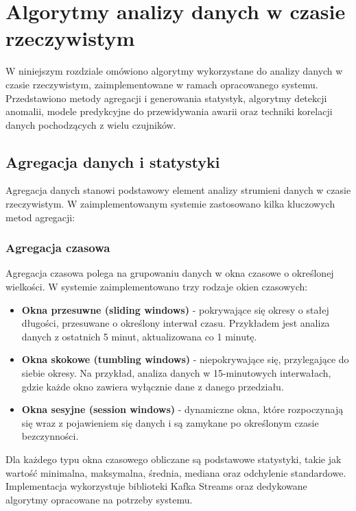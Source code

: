 \section{Algorytmy analizy danych w czasie rzeczywistym}
\label{sec:algorytmy_analizy}

W niniejszym rozdziale omówiono algorytmy wykorzystane do analizy danych w czasie rzeczywistym, zaimplementowane w ramach opracowanego systemu. Przedstawiono metody agregacji i generowania statystyk, algorytmy detekcji anomalii, modele predykcyjne do przewidywania awarii oraz techniki korelacji danych pochodzących z wielu czujników.

\subsection{Agregacja danych i statystyki}
\label{subsec:agregacja_statystyki}

Agregacja danych stanowi podstawowy element analizy strumieni danych w czasie rzeczywistym. W zaimplementowanym systemie zastosowano kilka kluczowych metod agregacji:

\subsubsection{Agregacja czasowa}
\label{subsubsec:agregacja_czasowa}

Agregacja czasowa polega na grupowaniu danych w okna czasowe o określonej wielkości. W systemie zaimplementowano trzy rodzaje okien czasowych:

\begin{itemize}
    \item \textbf{Okna przesuwne (sliding windows)} - pokrywające się okresy o stałej długości, przesuwane o określony interwał czasu. Przykładem jest analiza danych z ostatnich 5 minut, aktualizowana co 1 minutę.
    \item \textbf{Okna skokowe (tumbling windows)} - niepokrywające się, przylegające do siebie okresy. Na przykład, analiza danych w 15-minutowych interwałach, gdzie każde okno zawiera wyłącznie dane z danego przedziału.
    \item \textbf{Okna sesyjne (session windows)} - dynamiczne okna, które rozpoczynają się wraz z pojawieniem się danych i są zamykane po określonym czasie bezczynności.
\end{itemize}

Dla każdego typu okna czasowego obliczane są podstawowe statystyki, takie jak wartość minimalna, maksymalna, średnia, mediana oraz odchylenie standardowe. Implementacja wykorzystuje biblioteki Kafka Streams oraz dedykowane algorytmy opracowane na potrzeby systemu.

